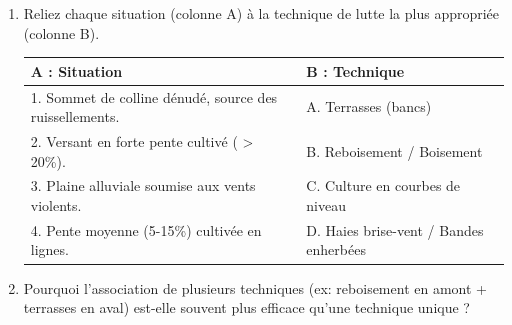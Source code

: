 \documentclass[11pt]{article}
\begin{document}
\begin{exercice}
\begin{enumerate}
    \item Reliez chaque situation (colonne A) à la technique de lutte la plus appropriée (colonne B).
    \begin{tabular}{|p{5cm}|p{5cm}|}
    \hline
    \textbf{A : Situation} & \textbf{B : Technique} \\
    \hline
    1. Sommet de colline dénudé, source des ruissellements. & A. Terrasses (bancs) \\
    \hline
    2. Versant en forte pente cultivé ( > 20\%). & B. Reboisement / Boisement \\
    \hline
    3. Plaine alluviale soumise aux vents violents. & C. Culture en courbes de niveau \\
    \hline
    4. Pente moyenne (5-15\%) cultivée en lignes. & D. Haies brise-vent / Bandes enherbées \\
    \hline
    \end{tabular}
    \item Pourquoi l'association de plusieurs techniques (ex: reboisement en amont + terrasses en aval) est-elle souvent plus efficace qu'une technique unique ?
\end{enumerate}
\end{exercice}
\end{document}
